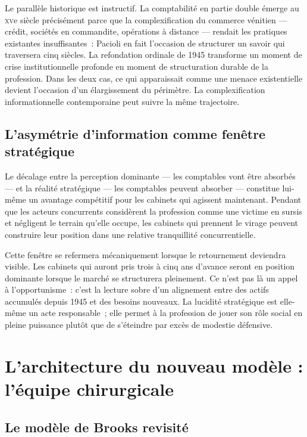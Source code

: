 \documentclass[12pt,a4paper]{article}
\begin{document}
Le parallèle historique est instructif. La comptabilité en partie double émerge au \textsc{xv}e siècle précisément parce que la complexification du commerce vénitien --- crédit, sociétés en commandite, opérations à distance --- rendait les pratiques existantes insuffisantes~: Pacioli en fait l'occasion de structurer un savoir qui traversera cinq siècles. La refondation ordinale de 1945 transforme un moment de crise institutionnelle profonde en moment de structuration durable de la profession. Dans les deux cas, ce qui apparaissait comme une menace existentielle devient l'occasion d'un élargissement du périmètre. La complexification informationnelle contemporaine peut suivre la même trajectoire.

\subsection{L'asymétrie d'information comme fenêtre stratégique}

Le décalage entre la perception dominante --- les comptables vont être absorbés --- et la réalité stratégique --- les comptables peuvent absorber --- constitue lui-même un avantage compétitif pour les cabinets qui agissent maintenant. Pendant que les acteurs concurrents considèrent la profession comme une victime en sursis et négligent le terrain qu'elle occupe, les cabinets qui prennent le virage peuvent construire leur position dans une relative tranquillité concurrentielle.

Cette fenêtre se refermera mécaniquement lorsque le retournement deviendra visible. Les cabinets qui auront pris trois à cinq ans d'avance seront en position dominante lorsque le marché se structurera pleinement. Ce n'est pas là un appel à l'opportunisme~: c'est la lecture sobre d'un alignement entre des actifs accumulés depuis 1945 et des besoins nouveaux. La lucidité stratégique est elle-même un acte responsable~; elle permet à la profession de jouer son rôle social en pleine puissance plutôt que de s'éteindre par excès de modestie défensive.

\section{L'architecture du nouveau modèle : l'équipe chirurgicale}

\subsection{Le modèle de Brooks revisité}
\end{document}
